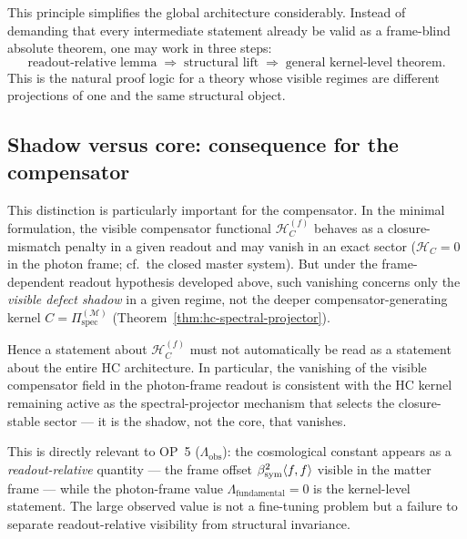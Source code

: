 This principle simplifies the global architecture considerably.
Instead of demanding that every intermediate statement already be valid
as a frame-blind absolute theorem, one may work in three steps:
\[
 \text{readout-relative lemma}
 \;\Longrightarrow\;
 \text{structural lift}
 \;\Longrightarrow\;
 \text{general kernel-level theorem}.
\]
This is the natural proof logic for a theory whose visible regimes are
different projections of one and the same structural object.

\subsection*{Shadow versus core: consequence for the compensator}

\begin{remark}
\label{rem:hc-shadow-vs-core}
This distinction is particularly important for the compensator.
In the minimal formulation, the visible compensator functional
$\mathcal{H}_C^{(f)}$ behaves as a closure-mismatch penalty in a given
readout and may vanish in an exact sector ($\mathcal{H}_C = 0$ in the
photon frame; cf.\ the closed master system). But under the
frame-dependent readout hypothesis developed above, such vanishing
concerns only the \emph{visible defect shadow} in a given regime, not
the deeper compensator-generating kernel
$C = \Pi^{(\mathcal{M})}_{\mathrm{spec}}$
(Theorem~\ref{thm:hc-spectral-projector}).

Hence a statement about $\mathcal{H}_C^{(f)}$ must not automatically be
read as a statement about the entire HC architecture. In particular, the
vanishing of the visible compensator field in the photon-frame readout
is consistent with the HC kernel remaining active as the
spectral-projector mechanism that selects the closure-stable sector ---
it is the shadow, not the core, that vanishes.

This is directly relevant to OP~5 ($\Lambda_{\mathrm{obs}}$): the
cosmological constant appears as a \emph{readout-relative} quantity ---
the frame offset $\beta_{\mathrm{sym}}^2\langle f,f\rangle$ visible in the matter frame
--- while the photon-frame value $\Lambda_{\mathrm{fundamental}} = 0$
is the kernel-level statement. The large observed value is not a
fine-tuning problem but a failure to separate readout-relative visibility
from structural invariance.
\end{remark}


